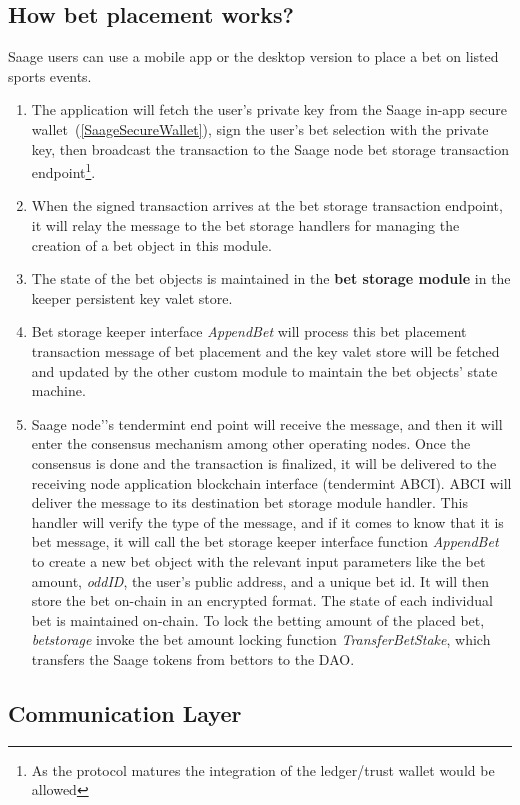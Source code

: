 \documentclass[%
 aapm,
 mph,%
 amsmath,amssymb,
 reprint,%
]{revtex4-2}
\begin{document}
\subsection{How bet placement works?}
Saage users can use a mobile app or the desktop version to place a bet on listed sports events. 
\begin{enumerate}
\item The application will fetch the user's private key from the Saage in-app secure wallet~(\ref{SaageSecureWallet}), sign the user's bet selection with the private key, then broadcast the transaction to the Saage node bet storage transaction endpoint\footnote{As the protocol matures the integration of the ledger/trust wallet would be allowed}.
\item When the signed transaction arrives at the bet storage transaction endpoint, it will relay the message to the bet storage handlers for managing the creation of a bet object in this module. 
\item The state of the bet objects is maintained in the \textbf{bet storage module} in the keeper persistent key valet store. 
\item Bet storage keeper interface \textit{AppendBet} will process this bet placement transaction message of bet placement and the key valet store will be fetched and updated by the other custom module to maintain the bet objects’ state machine. 
\item Saage node'’s tendermint end point will receive the message, and then it will enter the consensus mechanism among other operating nodes. Once the consensus is done and the transaction is finalized, it will be delivered to the receiving node application blockchain interface (tendermint ABCI). ABCI will deliver the message to its destination bet storage module handler. This handler will verify the type of the message, and if it comes to know that it is bet message, it will call the bet storage keeper interface function \textit{AppendBet} to create a new bet object with the relevant input parameters like the bet amount, \textit{oddID}, the user’s public address, and a unique bet id. It will then store the bet on-chain in an encrypted format. The state of each individual bet is maintained on-chain. To lock the betting amount of the placed bet, \textit{betstorage} invoke the bet amount locking function \textit{TransferBetStake}, which transfers the Saage tokens from bettors to the DAO. 
\end{enumerate}

\subsection{Communication Layer}
%
\end{document}

